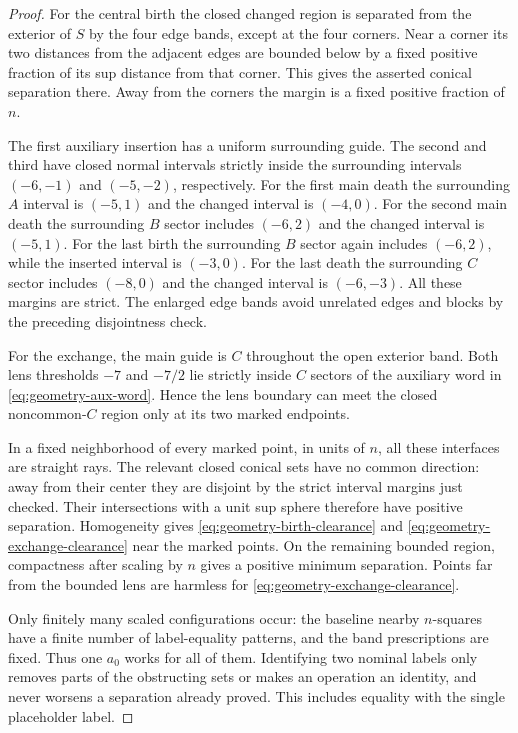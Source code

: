 \documentclass[11pt]{article}
\numberwithin{equation}{section}
\theoremstyle{definition}
\theoremstyle{remark}
\begin{document}
\begin{proof}
For the central birth the closed changed region is separated from the
exterior of $S$ by the four edge bands, except at the four corners.
Near a corner its two distances from the adjacent edges are bounded
below by a fixed positive fraction of its sup distance from that
corner.  This gives the asserted conical separation there.  Away from
the corners the margin is a fixed positive fraction of $n$.

The first auxiliary insertion has a uniform surrounding guide.  The
second and third have closed normal intervals strictly inside the
surrounding intervals $(-6,-1)$ and $(-5,-2)$, respectively.  For the
first main death the surrounding $A$ interval is $(-5,1)$ and the
changed interval is $(-4,0)$.  For the second main death the surrounding
$B$ sector includes $(-6,2)$ and the changed interval is $(-5,1)$.
For the last birth the surrounding $B$ sector again includes
$(-6,2)$, while the inserted interval is $(-3,0)$.  For the last death
the surrounding $C$ sector includes $(-8,0)$ and the changed interval
is $(-6,-3)$.  All these margins are strict.  The enlarged edge bands
avoid unrelated edges and blocks by the preceding disjointness check.

For the exchange, the main guide is $C$ throughout the open exterior
band.  Both lens thresholds $-7$ and $-7/2$ lie strictly inside $C$
sectors of the auxiliary word in \eqref{eq:geometry-aux-word}.
Hence the lens boundary can meet the closed noncommon-$C$ region only
at its two marked endpoints.

In a fixed neighborhood of every marked point, in units of $n$, all
these interfaces are straight rays.  The relevant closed conical sets
have no common direction: away from their center they are disjoint by
the strict interval margins just checked.  Their intersections with a
unit sup sphere therefore have positive separation.  Homogeneity gives
\eqref{eq:geometry-birth-clearance} and
\eqref{eq:geometry-exchange-clearance} near the marked points.  On
the remaining bounded region, compactness after scaling by $n$ gives
a positive minimum separation.  Points far from the bounded lens are
harmless for \eqref{eq:geometry-exchange-clearance}.

Only finitely many scaled configurations occur: the baseline nearby
$n$-squares have a finite number of label-equality patterns, and the
band prescriptions are fixed.  Thus one $a_0$ works for all of them.
Identifying two nominal labels only removes parts of the obstructing
sets or makes an operation an identity, and never worsens a separation
already proved.  This includes equality with the single placeholder
label.
\end{proof}
\end{document}
